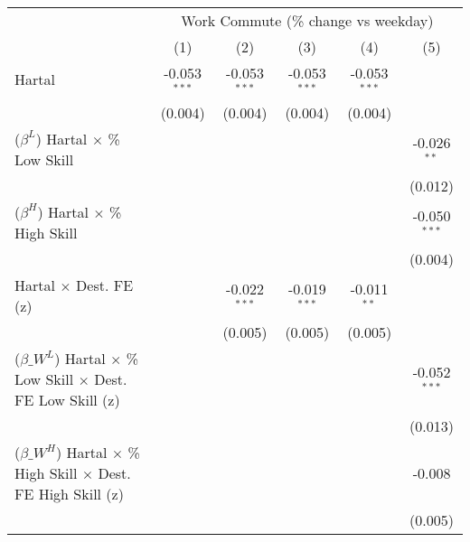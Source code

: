 {
\def\sym#1{\ifmmode^{#1}\else\(^{#1}\)\fi}
\begin{tabular}{l*{5}{c}}
\toprule
            &\multicolumn{5}{c}{Work Commute (\% change vs weekday)}                                                 \\\cmidrule(lr){2-6}
            &\multicolumn{1}{c}{(1)}        &\multicolumn{1}{c}{(2)}        &\multicolumn{1}{c}{(3)}        &\multicolumn{1}{c}{(4)}        &\multicolumn{1}{c}{(5)}        \\
\midrule
Hartal      &      -0.053$^{***}$&      -0.053$^{***}$&      -0.053$^{***}$&      -0.053$^{***}$&                    \\
            &     (0.004)        &     (0.004)        &     (0.004)        &     (0.004)        &                    \\
\addlinespace
\quad ($\beta^L$) Hartal $\times$ \% Low Skill&                    &                    &                    &                    &      -0.026$^{**}$ \\
            &                    &                    &                    &                    &     (0.012)        \\
\addlinespace
\quad ($\beta^H$) Hartal $\times$ \% High Skill&                    &                    &                    &                    &      -0.050$^{***}$\\
            &                    &                    &                    &                    &     (0.004)        \\
\addlinespace
\quad Hartal $\times$ Dest. FE (z) &                    &      -0.022$^{***}$&      -0.019$^{***}$&      -0.011$^{**}$ &                    \\
            &                    &     (0.005)        &     (0.005)        &     (0.005)        &                    \\
\addlinespace
\quad ($\beta\_W^L$) Hartal $\times$ \% Low Skill $\times$ Dest. FE Low Skill (z)&                    &                    &                    &                    &      -0.052$^{***}$\\
            &                    &                    &                    &                    &     (0.013)        \\
\addlinespace
\quad ($\beta\_W^H$) Hartal $\times$ \% High Skill $\times$ Dest. FE High Skill (z)&                    &                    &                    &                    &      -0.008        \\
            &                    &                    &                    &                    &     (0.005)        \\

\end{tabular}}
